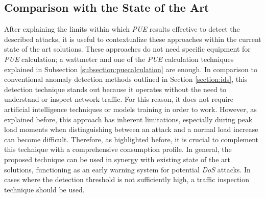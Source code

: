 \subsection{Comparison with the State of the Art}
After explaining the limits within which \emph{PUE} results effective to detect the described attacks, it is useful to contextualize these approaches within the current state of the art solutions. These approaches do not need specific equipment for \emph{PUE} calculation; a wattmeter and one of the \emph{PUE} calculation techniques explained in Subsection \ref{subsection:puecalculation} are enough. In comparison to conventional anomaly detection methods outlined in Section \ref{section:ids}, this detection technique stands out because it operates without the need to understand or inspect network traffic. For this reason, it does not require artificial intelligence techniques or models training in order to work. However, as explained before, this approach has inherent limitations, especially during peak load moments when distinguishing between an attack and a normal load increase can become difficult. Therefore, as highlighted before, it is crucial to complement this technique with a comprehensive consumption profile. In general, the proposed technique can be used in synergy with existing state of the art solutions, functioning as an early warning system for potential \emph{DoS} attacks. In cases where the detection threshold is not sufficiently high, a traffic inspection technique should be used.






